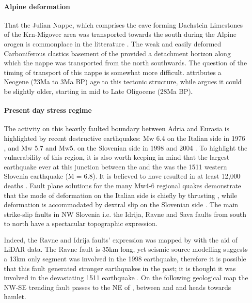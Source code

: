 \paragraph{Alpine deformation}
\label{par:alpine deformation}
That the Julian Nappe, which comprises the cave forming Dachstein Limestones of the Krn-Migovec area was transported towards the south during the Alpine orogen is commonplace in the litterature \citep{doglioni1987eoalpine,placer1998contribution}. 
The weak and easily deformed Carboniferous clastics basement of the  provided a detachment horizon along which the nappe was transported from the north southwards. The question of the timing of transport of this nappe is somewhat more difficult. \citet{buser1986tolmavc} attributes a Neogene (\~23Ma to 3Ma BP) age to this tectonic structure, while \citet{placer1998contribution} argues it could be slightly older, starting in mid to Late Oligocene (28Ma BP).

\paragraph{Present day stress regime}
\label{par:present day stress regime}
The activity on this heavily faulted boundary between Adria and Eurasia is highlighted by recent destructive earthquakes: Mw 6.4 on the Italian side in 1976 \citep{pondrelli2001seismotectonic}, and Mw 5.7 and Mw5. on the Slovenian side in 1998 \citep{bajc20011998} and 2004 \citep{aoudia2005july}. 
To highlight the vulnerability of this region, it is also worth keeping in mind that the largest earthquake ever at this junction between the  and the  was the 1511 western Slovenia earthquake (M = 6.8). It is believed to have resulted in at least 12,000 deaths \citep{fitzko2005constraints}.
Fault plane solutions for the many Mw4-6 regional quakes demonstrate that the mode of deformation on the Italian side is chiefly by thrusting \citep{poli2002new}, while deformation is accommodated by dextral slip on the Slovenian side \citep{poljak2000seismotectonic}. 
The main strike-slip faults in NW Slovenia i.e. the Idrija, Ravne and Sava faults from south to north have a spectacular topographic expression. 

Indeed, the Ravne and Idrija faults' expression was mapped by \citet{cunningham2006application} with the aid of LiDAR data. The Ravne fault is \~35km long, yet seismic source modelling suggests a 13km only segment was involved in the 1998 earthquake, therefore it is possible that this fault generated stronger earthquakes in the past; it is thought it was involved in the devastating 1511 earthquake \citet{fitzko2005constraints}.
On the following geological map  the NW-SE trending fault passes to the NE of , between  and  and heads towards  hamlet.

